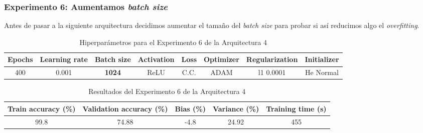 \documentclass{article}
\begin{document}
        \subsubsection{Experimento 6: Aumentamos \textit{batch size}}
        \label{d-s-a4-e6}
			Antes de pasar a la siguiente arquitectura decidimos aumentar el tama\~no del \textit{batch size} para probar si as\'i reducimos algo el \textit{overfitting}.
			
			\begin{table}[!h]
				\begin{tabular}{|c|c|c|c|c|c|c|c|}
					\textbf{Epochs}&\textbf{Learning rate}&\textbf{Batch size}&\textbf{Activation}&\textbf{Loss}&\textbf{Optimizer}&\textbf{Regularization}  & \textbf{Initializer} \\ \hline
					400 & 0.001 & \textbf{1024} & ReLU & C.C. & ADAM & l1 0.0001 & He Normal
				\end{tabular}
				\caption{Hiperpar\'ametros para el Experimento 6 de la Arquitectura 4}
				\label{tab:hip-d-a4-e6}
			\end{table}
			
			\begin{table}[!h]
				\begin{center}
					\begin{tabular}{| c | c | c | c | c |}
						\textbf{Train accuracy (\%)} & \textbf{Validation accuracy (\%)} & \textbf{Bias (\%)} & \textbf{Variance (\%)} & \textbf{Training time (s)} \\ \hline
						99.8 & 74.88 & -4.8 & 24.92 & 455 \\ \hline
					\end{tabular}
					\caption{Resultados del Experimento 6 de la Arquitectura 4}
					\label{tab:res-d-a4-e6}
				\end{center}
			\end{table}
   
\end{document}
